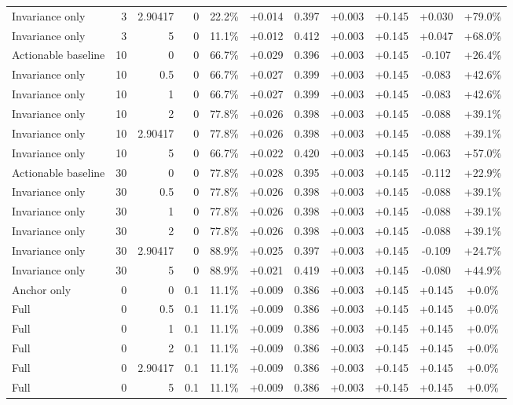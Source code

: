 \begin{table}[htbp]
\begin{tabular}{lrrrccccccc}
Invariance only & 3 & 2.90417 & 0 & 22.2\% & +0.014 & 0.397 & +0.003 & +0.145 & +0.030 & +79.0\% \\
Invariance only & 3 & 5 & 0 & 11.1\% & +0.012 & 0.412 & +0.003 & +0.145 & +0.047 & +68.0\% \\
Actionable baseline & 10 & 0 & 0 & 66.7\% & +0.029 & 0.396 & +0.003 & +0.145 & -0.107 & +26.4\% \\
Invariance only & 10 & 0.5 & 0 & 66.7\% & +0.027 & 0.399 & +0.003 & +0.145 & -0.083 & +42.6\% \\
Invariance only & 10 & 1 & 0 & 66.7\% & +0.027 & 0.399 & +0.003 & +0.145 & -0.083 & +42.6\% \\
Invariance only & 10 & 2 & 0 & 77.8\% & +0.026 & 0.398 & +0.003 & +0.145 & -0.088 & +39.1\% \\
Invariance only & 10 & 2.90417 & 0 & 77.8\% & +0.026 & 0.398 & +0.003 & +0.145 & -0.088 & +39.1\% \\
Invariance only & 10 & 5 & 0 & 66.7\% & +0.022 & 0.420 & +0.003 & +0.145 & -0.063 & +57.0\% \\
Actionable baseline & 30 & 0 & 0 & 77.8\% & +0.028 & 0.395 & +0.003 & +0.145 & -0.112 & +22.9\% \\
Invariance only & 30 & 0.5 & 0 & 77.8\% & +0.026 & 0.398 & +0.003 & +0.145 & -0.088 & +39.1\% \\
Invariance only & 30 & 1 & 0 & 77.8\% & +0.026 & 0.398 & +0.003 & +0.145 & -0.088 & +39.1\% \\
Invariance only & 30 & 2 & 0 & 77.8\% & +0.026 & 0.398 & +0.003 & +0.145 & -0.088 & +39.1\% \\
Invariance only & 30 & 2.90417 & 0 & 88.9\% & +0.025 & 0.397 & +0.003 & +0.145 & -0.109 & +24.7\% \\
Invariance only & 30 & 5 & 0 & 88.9\% & +0.021 & 0.419 & +0.003 & +0.145 & -0.080 & +44.9\% \\
Anchor only & 0 & 0 & 0.1 & 11.1\% & +0.009 & 0.386 & +0.003 & +0.145 & +0.145 & +0.0\% \\
Full & 0 & 0.5 & 0.1 & 11.1\% & +0.009 & 0.386 & +0.003 & +0.145 & +0.145 & +0.0\% \\
Full & 0 & 1 & 0.1 & 11.1\% & +0.009 & 0.386 & +0.003 & +0.145 & +0.145 & +0.0\% \\
Full & 0 & 2 & 0.1 & 11.1\% & +0.009 & 0.386 & +0.003 & +0.145 & +0.145 & +0.0\% \\
Full & 0 & 2.90417 & 0.1 & 11.1\% & +0.009 & 0.386 & +0.003 & +0.145 & +0.145 & +0.0\% \\
Full & 0 & 5 & 0.1 & 11.1\% & +0.009 & 0.386 & +0.003 & +0.145 & +0.145 & +0.0\% \\

\end{tabular}
\end{table}
